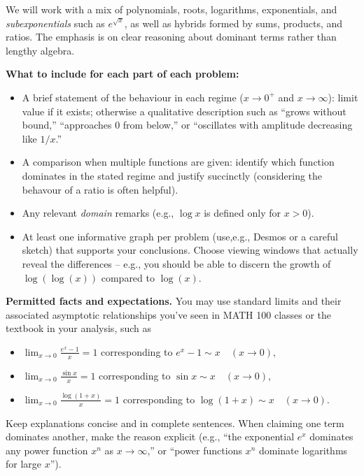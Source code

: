 \documentclass[answers,addpoints]{exam}
\begin{document}
\begin{questions}
    We will work with a mix of polynomials, roots, logarithms, exponentials, and \emph{subexponentials} such as $e^{\sqrt{x}}$, as well as hybrids formed by sums, products, and ratios. The emphasis is on clear reasoning about dominant terms rather than lengthy algebra.

    \medskip
    \textbf{What to include for each part of each problem:}
    \begin{itemize}
      \item A brief statement of the behaviour in each regime ($x \to 0^+$ and $x \to \infty$): limit value if it exists; otherwise a qualitative description such as “grows without bound,” “approaches $0$ from below,” or “oscillates with amplitude decreasing like $1/x$.”
      \item A comparison when multiple functions are given: identify which function dominates in the stated regime and justify succinctly (considering the behavour of a ratio is often helpful).
      \item Any relevant \emph{domain} remarks (e.g., $\log x$ is defined only for $x>0$).
      \item At least one informative graph per problem (use,e.g., Desmos or a careful sketch) that supports your conclusions. Choose viewing windows that actually reveal the differences -- e.g., you should be able to discern the growth of $\log(\log(x))$ compared to $\log(x)$.
    \end{itemize}

    \medskip
    \textbf{Permitted facts and expectations.} You may use standard limits and their associated asymptotic relationships you've seen in MATH 100 classes or the textbook in your analysis, such as
    \begin{itemize}
      \item $\displaystyle\lim_{x\to 0} \frac{e^x-1}{x}=1$ corresponding to $e^x-1 \sim x \quad (x\to 0),$

      \item $\displaystyle\lim_{x\to 0}\frac{\sin x}{x}= 1$ corresponding to
        $\sin x \sim x \quad (x\to 0)$,

      \item $\displaystyle\lim_{x\to 0}\frac{\log(1+x)}{x} = 1$ corresponding to $\log(1+x)\sim x \quad (x\to 0)$.

    \end{itemize}
    Keep explanations concise and in complete sentences. When claiming one term dominates another, make the reason explicit (e.g., “the exponential $e^{x}$ dominates any power function $x^n$ as $x\to\infty$,” or “power functions $x^n$ dominate logarithms for large $x$”).


\end{questions}
\end{document}

